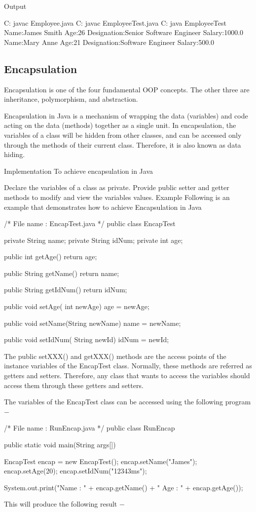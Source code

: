 Output

C:\> javac Employee.java
C:\> javac EmployeeTest.java
C:\> java EmployeeTest
Name:James Smith
Age:26
Designation:Senior Software Engineer
Salary:1000.0
Name:Mary Anne
Age:21
Designation:Software Engineer
Salary:500.0

\subsection{Encapsulation}

Encapsulation is one of the four fundamental OOP concepts. The other three are inheritance, polymorphism, and abstraction.

Encapsulation in Java is a mechanism of wrapping the data (variables) and code acting on the data (methods) together as a single unit. In encapsulation, the variables of a class will be hidden from other classes, and can be accessed only through the methods of their current class. Therefore, it is also known as data hiding.

Implementation
To achieve encapsulation in Java

Declare the variables of a class as private.
Provide public setter and getter methods to modify and view the variables values.
Example
Following is an example that demonstrates how to achieve Encapsulation in Java

/* File name : EncapTest.java */
public class EncapTest {
   private String name;
   private String idNum;
   private int age;

   public int getAge() {
      return age;
   }

   public String getName() {
      return name;
   }

   public String getIdNum() {
      return idNum;
   }

   public void setAge( int newAge) {
      age = newAge;
   }

   public void setName(String newName) {
      name = newName;
   }

   public void setIdNum( String newId) {
      idNum = newId;
   }
}
The public setXXX() and getXXX() methods are the access points of the instance variables of the EncapTest class. Normally, these methods are referred as getters and setters. Therefore, any class that wants to access the variables should access them through these getters and setters.

The variables of the EncapTest class can be accessed using the following program −

/* File name : RunEncap.java */
public class RunEncap {

   public static void main(String args[]) {
      EncapTest encap = new EncapTest();
      encap.setName("James");
      encap.setAge(20);
      encap.setIdNum("12343ms");

      System.out.print("Name : " + encap.getName() + " Age : " + encap.getAge());
   }
}
This will produce the following result −

